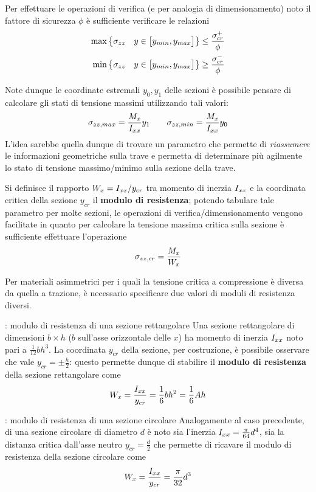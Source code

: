 		Per effettuare le operazioni di verifica (e per analogia di dimensionamento) noto il fattore di sicurezza $\phi$ è sufficiente verificare le relazioni
		\begin{align*}
			\max \big\{ \sigma_{zz} \quad y \in \big[y_{min}, y_{max}\big]\big\} & \leq \frac{\sigma_{cr}^+}{\phi} \\
			\min \big\{ \sigma_{zz} \quad y \in \big[y_{min}, y_{max}\big]\big\} & \geq  \frac{\sigma_{cr}^-}{\phi}
		\end{align*}
		
		Note dunque le coordinate estremali $y_0, y_1$ delle sezioni è possibile pensare di calcolare gli stati di tensione massimi utilizzando tali valori:
		\[ \sigma_{zz,max} = \frac {M_x} {I_{xx}} y_1 \qquad \sigma_{zz,min} = \frac {M_x} {I_{xx}} y_0 \]
		L'idea sarebbe quella dunque di trovare un parametro che permette di \textit{riassumere} le informazioni geometriche sulla trave e permetta di determinare più agilmente lo stato di tensione massimo/minimo sulla sezione della trave.
		
		\begin{concetto}
			Si definisce il rapporto $W_x = I_{xx} / y_{cr}$ tra momento di inerzia $I_{xx}$ e la coordinata critica della sezione $y_{cr}$ il \textbf{modulo di resistenza}; potendo tabulare tale parametro per molte sezioni, le operazioni di verifica/dimensionamento vengono facilitate in quanto per calcolare la tensione massima critica sulla sezione è sufficiente effettuare l'operazione
			\begin{equation}
				\sigma_{zz,cr} = \frac{M_x}{W_x}
			\end{equation}
		\end{concetto} 
		\begin{osservazione}
			Per materiali asimmetrici per i quali la tensione critica a compressione è diversa da quella a trazione, è necessario specificare due valori di moduli di resistenza diversi.
		\end{osservazione}
		\begin{esempio}{: modulo di resistenza di una sezione rettangolare} \label{es:sv:modresrettangolo}
			Una sezione rettangolare di dimensioni $b\times h$ ($b$ sull'asse orizzontale delle $x$) ha momento di inerzia $I_{xx}$ noto pari a $\frac 1 {12} bh^3$. La coordinata $y_{cr}$  della sezione, per costruzione, è possibile osservare che vale $ y_{cr} = \pm \frac h 2$: questo permette dunque di stabilire il \textbf{modulo di resistenza} della sezione rettangolare come
			\[ W_x = \frac{I_{xx}}{y_{cr}} = \frac 1 6 bh^2 =  \frac 1 6 A h  \]
		\end{esempio}
		\begin{esempio}{: modulo di resistenza di una sezione circolare}
			Analogamente al caso precedente, di una sezione circolare di diametro $d$ è noto sia l'inerzia $I_{xx} =\frac \pi {64}d^4$, sia la distanza critica dall'asse neutro $y_{cr} = \frac d 2$ che permette di ricavare il modulo di resistenza della sezione circolare come
			\[ W_x = \frac{I_{xx}}{y_{cr}} = \frac \pi {32} d^3  \]
	\end{esempio}
		
